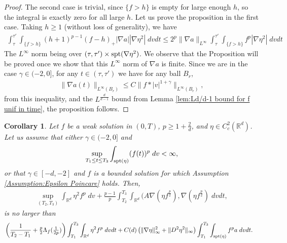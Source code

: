 \documentclass[12pt,american]{amsart}
\numberwithin{equation}{section}
\theoremstyle{plain}
\newtheorem{cor}[thm]{Corollary}
\theoremstyle{definition}                  %
\begin{document}
  \begin{proof}
    The second case is trivial, since $\{f>h\}$ is empty for large enough $h$, so the integral is exactly zero for all large $h$. Let us prove the proposition in the first case. Taking $h\geq 1$ (without loss of generality), we have
    \begin{align*}
      \int_{\tau}^{\tau'}\int_{\{f>h\}}(h+1)^{p-1}(f-h)_+|\nabla a||\nabla \eta^2|\;dvdt \leq 2^p\|\nabla a\|_{L^\infty}\int_{\tau}^{\tau'}\int_{\{f>h\}}f^p|\nabla \eta^2|\;dvdt
    \end{align*}
    The $L^\infty$ norm being over $(\tau,\tau')\times \textnormal{spt}(
    \nabla \eta^2)$. We observe that the Proposition will be proved once we show that this $L^\infty$ norm of $\nabla a$ is finite. Since we are in the case $\gamma \in (-2,0]$, for any $t\in (\tau,\tau')$ we have for any ball $B_r$,
    \begin{align*}
      \|\nabla a(t)\|_{L^\infty(B_r)} \leq C\| f * |v|^{1+\gamma}\|_{L^\infty(B_r)},
    \end{align*}
    from this inequality, and the $L^{\frac{d}{d-1}}$ bound from Lemma \ref{lem:Ld/d-1 bound for f unif in time}, the proposition follows.
  \end{proof}

  \begin{cor}\label{cor_iterat}
    Let $f$ be a weak solution in $(0,T)$, $p\geq 1+\tfrac{2}{d}$, and $\eta \in C^2_c(\mathbb{R}^d)$. Let us assume that either $\gamma \in (-2,0]$ and
    \begin{align*}
      \sup \limits_{T_1\leq t\leq T_3} \int_{\textnormal{spt}(\eta)} (f(t))^p\;dv < \infty,	  
    \end{align*}	  
    or that $\gamma \in [-d,-2]$ and $f$ is a bounded solution for which Assumption \ref{Assumption:Epsilon Poincare} holds. Then,
    \begin{align*}
      \sup \limits_{(T_2,T_3)}\int_{\mathbb{R}^d}\eta^2 f^p\;dv+\frac{p-1}{p}\int_{T_2}^{T_3}\int_{\mathbb{R}^d}(A\nabla (\eta f^{\frac{p}{2}}),\nabla (\eta f^{\frac{p}{2}})\;dvdt,
    \end{align*}
    is no larger than
    \begin{align*}
      & \left (\frac{1}{T_2-T_1}+\tfrac{p}{2} \Lambda_f (\tfrac{1}{2p}) \right )\int_{T_1}^{T_3}\int_{\mathbb{R}^d}\eta^2 f^p\;dvdt +C(d)\left (\|\nabla \eta\|_\infty^2+\|D^2\eta^2\|_\infty \right )\int_{T_1}^{T_3}\int_{\textnormal{spt}(\eta)}f^pa\;dvdt.	
    \end{align*}
  
  \end{cor}
\end{document}
